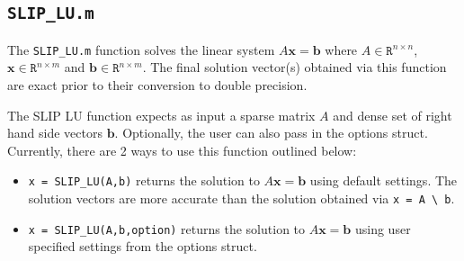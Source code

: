 \documentclass[12pt]{article}
\theoremstyle{definition}
\begin{document}
\cprotect\subsection{\verb|SLIP_LU.m|}
\label{s:Use:MATLAB:factor}

The \verb|SLIP_LU.m| function solves the linear system $A \mathbf{x} =
\mathbf{b}$ where $A \in \mathtt{R}^{n \times n}$, $\mathbf{x} \in
\mathtt{R}^{n \times m}$ and $\mathbf{b} \in \mathtt{R}^{n \times m}$. The
final solution vector(s) obtained via this function are exact prior to their
conversion to double precision.

The SLIP LU function expects as input a sparse matrix $A$ and dense set of
right hand side vectors $\mathbf{b}$. Optionally, the user can also pass in the
options struct. Currently, there are 2 ways to use this function outlined
below:

\begin{itemize}

\item \verb|x = SLIP_LU(A,b)| returns the solution to $A \mathbf{x} =
\mathbf{b}$ using default settings. The solution vectors are more accurate than
the solution obtained via \verb|x = A \ b|.

\item \verb|x = SLIP_LU(A,b,option)| returns the solution to $A \mathbf{x} =
\mathbf{b}$ using user specified settings from the options struct.

\end{itemize}


\newpage


\end{document}
